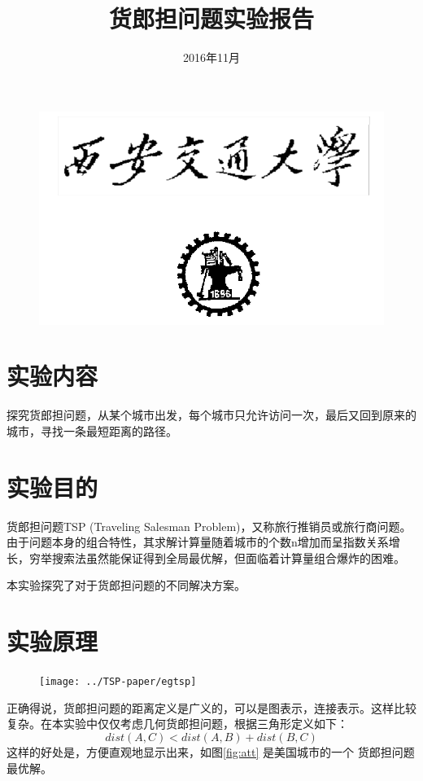 \documentclass{article}
\date{2016年11月}
\title{货郎担问题实验报告}
\newcommand{\huo}{货郎担问题}
\begin{document}
\begin{CJK}{UTF8}{gkai}
\begin{figure}
\centering
\includegraphics[width=0.6\linewidth]{xjtu}
\end{figure}
\maketitle
\clearpage

\section{实验内容}
探究货郎担问题，从某个城市出发，每个城市只允许访问一次，最后又回到原来的城市，寻找一条最短距离的路径。\cite{bao2010}
\section{实验目的}
货郎担问题TSP (Traveling Salesman Problem)，又称旅行推销员或旅行商问题。由于问题本身的组合特性，其求解计算量随着城市的个数n增加而呈指数关系增长，穷举搜索法虽然能保证得到全局最优解，但面临着计算量组合爆炸的困难。

本实验探究了对于货郎担问题的不同解决方案。

\section{实验原理}
\begin{figure}
	\centering
	\texttt{[image: ../TSP-paper/egtsp]}
	\caption{}
	\label{fig:egtsp}
\end{figure}

正确得说，\huo 的距离定义是广义的，可以是图表示，连接表示。这样比较复杂。在本实验中仅仅考虑几何货郎担问题，根据三角形定义如下：
\begin{equation}
dist(A, C) < dist(A, B) + dist(B, C)
\end{equation}
这样的好处是，方便直观地显示出来，如图\ref{fig:att} 是美国城市的一个 \huo 最优解。



\end{CJK}
\end{document}
